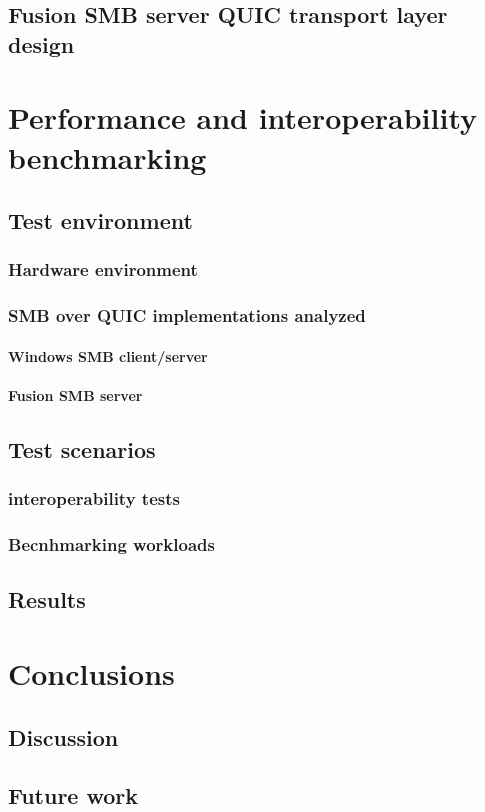 \documentclass[english, 12pt, a4paper, elec, utf8, a-2b, online]{aaltothesis}
\begin{document}
\subsection{Fusion SMB server QUIC transport layer design}
\clearpage
\section{Performance and interoperability benchmarking}
\label{sec:benchmark}
\subsection{Test environment}

\subsubsection{Hardware environment}

\subsubsection{SMB over QUIC implementations analyzed}

\paragraph{Windows SMB client/server}

\paragraph{Fusion SMB server}

\subsection{Test scenarios}

\subsubsection{interoperability tests}

\subsubsection{Becnhmarking workloads}

\subsection{Results}
\clearpage
\section{Conclusions}
\label{sec:conclusion}
\label{sec:summary}

\subsection{Discussion}

\subsection{Future work}

\clearpage
\printbibliography[heading=bibintoc] %
\end{document}
